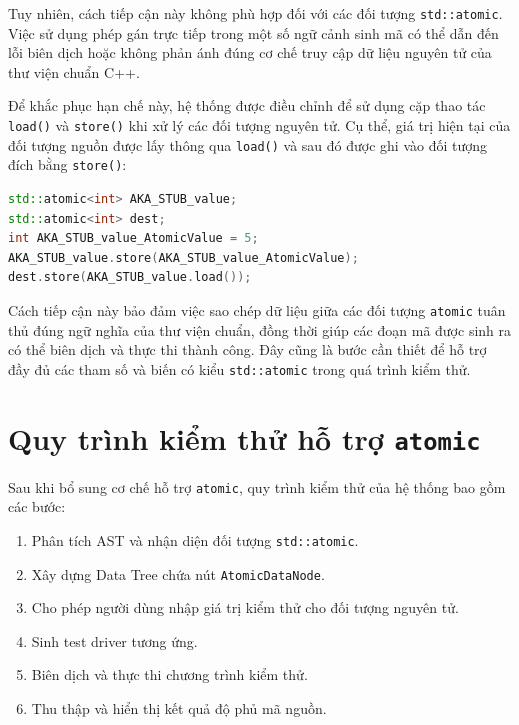 Tuy nhiên, cách tiếp cận này không phù hợp đối với các đối tượng \texttt{std::atomic}. Việc sử dụng phép gán trực tiếp trong một số ngữ cảnh sinh mã có thể dẫn đến lỗi biên dịch hoặc không phản ánh đúng cơ chế truy cập dữ liệu nguyên tử của thư viện chuẩn C++.

Để khắc phục hạn chế này, hệ thống được điều chỉnh để sử dụng cặp thao tác \texttt{load()} và \texttt{store()} khi xử lý các đối tượng nguyên tử. Cụ thể, giá trị hiện tại của đối tượng nguồn được lấy thông qua \texttt{load()} và sau đó được ghi vào đối tượng đích bằng \texttt{store()}:

\begin{lstlisting}[language=C++,caption={Ví dụ sử dụng stub với đối tượng std::atomic},label={lst:std_atomic_stub_example}]
std::atomic<int> AKA_STUB_value;
std::atomic<int> dest;
int AKA_STUB_value_AtomicValue = 5;
AKA_STUB_value.store(AKA_STUB_value_AtomicValue);
dest.store(AKA_STUB_value.load());
\end{lstlisting}

Cách tiếp cận này bảo đảm việc sao chép dữ liệu giữa các đối tượng \texttt{atomic} tuân thủ đúng ngữ nghĩa của thư viện chuẩn, đồng thời giúp các đoạn mã được sinh ra có thể biên dịch và thực thi thành công. Đây cũng là bước cần thiết để hỗ trợ đầy đủ các tham số và biến có kiểu \texttt{std::atomic} trong quá trình kiểm thử.

\section{Quy trình kiểm thử hỗ trợ \texttt{atomic}}

Sau khi bổ sung cơ chế hỗ trợ \texttt{atomic}, quy trình kiểm thử của hệ thống bao gồm các bước:

\begin{enumerate}
\item Phân tích AST và nhận diện đối tượng \texttt{std::atomic}.
\item Xây dựng Data Tree chứa nút \texttt{AtomicDataNode}.
\item Cho phép người dùng nhập giá trị kiểm thử cho đối tượng nguyên tử.
\item Sinh test driver tương ứng.
\item Biên dịch và thực thi chương trình kiểm thử.
\item Thu thập và hiển thị kết quả độ phủ mã nguồn.
\end{enumerate}

